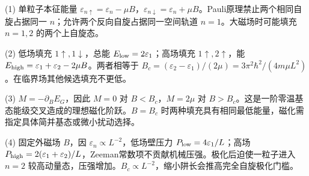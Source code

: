 (1) 单粒子本征能量 \(\varepsilon_{n\uparrow}=\varepsilon_n-\mu B\)，\(\varepsilon_{n\downarrow}=\varepsilon_n+\mu B\)。Pauli原理禁止两个相同自旋占据同一 \(n\)；允许两个反向自旋占据同一空间轨道 \(n=1\)。大磁场时可能填充 \(n=1,2\) 的两个上自旋态。

(2) 低场填充 \(1\uparrow,1\downarrow\)，总能 \(E_{\rm low}=2\varepsilon_1\)；高场填充 \(1\uparrow,2\uparrow\)，能 \(E_{\rm high}=\varepsilon_1+\varepsilon_2-2\mu B\)。两者相等于 \(\boxed{B_c=(\varepsilon_2-\varepsilon_1)/(2\mu)=3\pi^2\hbar^2/(4m\mu L^2)}\)。在临界场其他候选填充不更低。

(3) \(M=-\partial_BE_G\)，因此 \(M=0\) 对 \(B<B_c\)，\(M=2\mu\) 对 \(B>B_c\)。这是一阶零温基态能级交叉造成的理想磁化阶跃。\(B=B_c\) 时两种填充具有相同最低能量，磁化需指定具体简并基态或微小扰动选择。

(4) 固定外磁场 \(B\)，因 \(\varepsilon_n\propto L^{-2}\)，低场壁压力 \(P_{\rm low}=4\varepsilon_1/L\)；高场 \(P_{\rm high}=2(\varepsilon_1+\varepsilon_2)/L\)，Zeeman常数项不贡献机械压强。极化后迫使一粒子进入 \(n=2\) 较高动量态，压强增加。\(B_c\propto L^{-2}\)，缩小阱长会推高完全自旋极化门槛。
